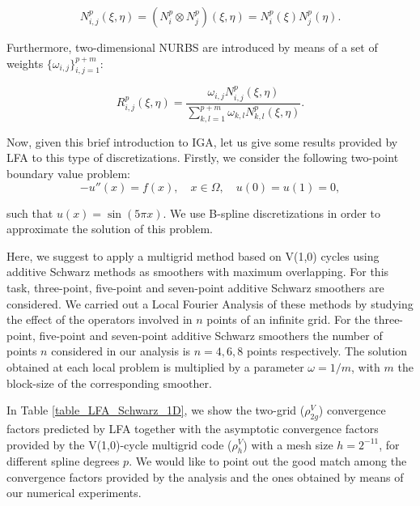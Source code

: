 \documentclass{article}
\begin{document}
$$
N_{i,j}^p(\xi,\eta) = (N_i^p \otimes N_j^p)(\xi,\eta) = N_i^p(\xi) N_j^p(\eta).
$$ 

Furthermore, two-dimensional NURBS are introduced by means of a set of weights $\lbrace\omega_{i,j}\rbrace_{i,j=1}^{p+m}$:

$$
R_{i,j}^p(\xi,\eta) = \frac{ \omega_{i,j} N_{i,j}^p(\xi,\eta)}{\sum_{k,l=1}^{p+m} \omega_{k,l} N_{k,l}^p(\xi,\eta) }.
$$

Now, given this brief introduction to IGA, let us give some results provided by LFA to this type of discretizations. Firstly, we consider the following two-point boundary value problem:
$$
-u''(x) = f(x), \quad x \in \Omega, \quad  u(0) = u(1) = 0,
$$

\noindent such that $u(x)=\sin(5\pi x)$. We use B-spline discretizations in order to approximate the solution of this problem. 

Here, we suggest to apply a multigrid method based on V(1,0) cycles using additive Schwarz methods as smoothers with maximum overlapping. For this task, three-point, five-point and seven-point additive Schwarz smoothers are considered. We carried out a Local Fourier Analysis of these methods by studying the effect of the operators involved in $n$ points of an infinite grid. For the three-point, five-point and seven-point additive Schwarz smoothers the number of points $n$ considered in our analysis is $n=4,6,8$ points respectively. The solution obtained at each local problem is multiplied by a parameter $\omega=1/m$, with $m$ the block-size of the corresponding smoother.

In Table \ref{table_LFA_Schwarz_1D}, we show the two-grid ($\rho^V_{2g}$) convergence factors predicted by LFA together with the asymptotic convergence factors provided by the V(1,0)-cycle multigrid code ($\rho^V_h$) with a mesh size $h=2^{-11}$, for different spline degrees $p$. We would like to point out the good match among the convergence factors provided by the analysis and the ones obtained by means of our numerical experiments.
\end{document}
